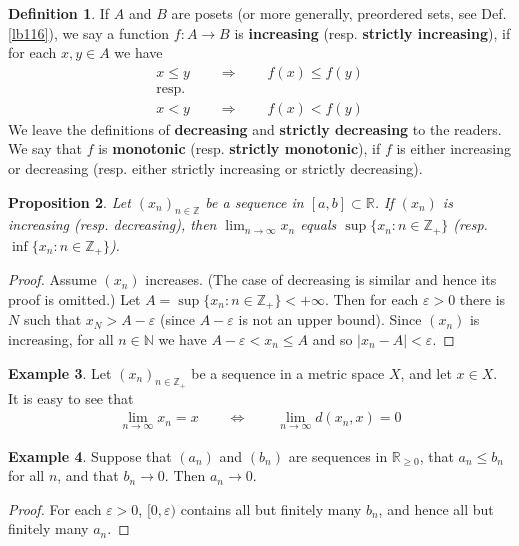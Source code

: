 \documentclass[12pt,b5paper,notitlepage]{article}
\theoremstyle{definition}
\newtheorem{df}{Definition}[section]
\newtheorem{eg}[df]{Example}
\theoremstyle{plain}
\newtheorem{pp}[df]{Proposition}
\newcommand{\Nbb}{\mathbb N}
\newcommand{\Zbb}{\mathbb Z}
\newcommand{\Rbb}{\mathbb R}
\newcommand{\dps}{\displaystyle}
\newcommand{\eps}{\varepsilon}
\numberwithin{equation}{section}
\begin{document}
\begin{df}
If $A$ and $B$ are posets (or more generally, preordered sets, see Def. \ref{lb116}), we say a function $f:A\rightarrow B$ is \textbf{increasing}   (resp. \textbf{strictly increasing}), if for each $x,y\in A$ we have
\begin{gather*}
x\leq y\qquad\Longrightarrow\qquad f(x)\leq f(y)\\
\text{resp.}\\
x<y\qquad\Longrightarrow \qquad f(x)<f(y)
\end{gather*}
We leave the definitions of \textbf{decreasing} and \textbf{strictly decreasing} to the readers. We say that $f$ is   \textbf{monotonic} (resp. \textbf{strictly monotonic}), if $f$ is either increasing or decreasing (resp. either strictly increasing or strictly decreasing).
\end{df}


\begin{pp}\label{lb57}
Let $(x_n)_{n\in\Zbb}$ be a sequence in $[a,b]\subset\Rbb$. If $(x_n)$ is increasing (resp. decreasing), then $\dps\lim_{n\rightarrow \infty}x_n$ equals $\dps\sup\{x_n:n\in\Zbb_+\}$ (resp. $\dps\inf\{x_n:n\in\Zbb_+\}$).
\end{pp}

\begin{proof}
Assume $(x_n)$ increases. (The case of decreasing is similar and hence its proof is omitted.) Let $A=\sup\{x_n:n\in\Zbb_+\}<+\infty$. Then for each $\eps>0$ there is $N$ such that $x_N>A-\eps$ (since $A-\eps$ is not an upper bound). Since $(x_n)$ is increasing, for all $n\in\Nbb$ we have $A-\eps<x_n\leq A$ and so $|x_n-A|<\eps$.
\end{proof}



\begin{eg}\label{lb27}
Let $(x_n)_{n\in\Zbb_+}$ be a sequence in a metric space $X$, and let $x\in X$. It is easy to see that
\begin{align*}
\lim_{n\rightarrow\infty} x_n=x\qquad\Longleftrightarrow \qquad \lim_{n\rightarrow\infty} d(x_n,x)=0
\end{align*}
\end{eg}

\begin{eg}\label{lb28}
Suppose that $(a_n)$ and $(b_n)$ are sequences in $\Rbb_{\geq 0}$, that $a_n\leq b_n$ for all $n$, and that $b_n\rightarrow 0$. Then  $a_n\rightarrow 0$. 
\end{eg}
\begin{proof}
For each $\varepsilon>0$, $[0,\varepsilon)$ contains all but finitely many $b_n$, and hence all but finitely many $a_n$.
\end{proof}
\end{document}
